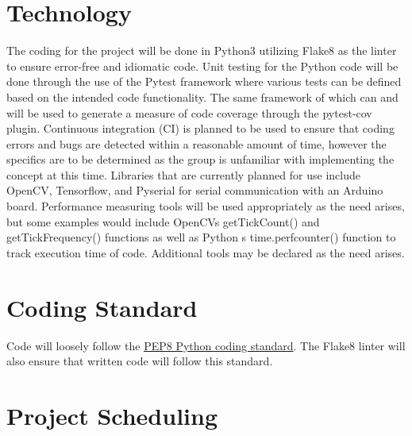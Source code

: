 \documentclass{article}
\begin{document}
\section{Technology}

The coding for the project will be done in Python3 utilizing Flake8 as the linter
to ensure error-free and idiomatic code. Unit testing for the Python code will be done
through the use of the Pytest framework where various tests can be defined based on the
intended code functionality. The same framework of which can and will be used to generate
a measure of code coverage through the pytest-cov plugin. Continuous integration (CI) is
planned to be used to ensure that coding errors and bugs are detected within a reasonable
amount of time, however the specifics are to be determined as the group is unfamiliar with
implementing the concept at this time. Libraries that are currently planned for use include
OpenCV, Tensorflow, and Pyserial for serial communication with an Arduino board. Performance
measuring tools will be used appropriately as the need arises, but some examples would include
OpenCV\textquotesingle s getTickCount() and getTickFrequency() functions as well as Python\textquotesingle
s time.perf\textunderscore counter() function to track execution time of code. Additional tools
may be declared as the need arises.

\section{Coding Standard}

Code will loosely follow the \href{https://peps.python.org/pep-0008/}{PEP8 Python coding standard}.
The Flake8 linter will also ensure that written code will follow this standard.

\section{Project Scheduling}

\end{document}
